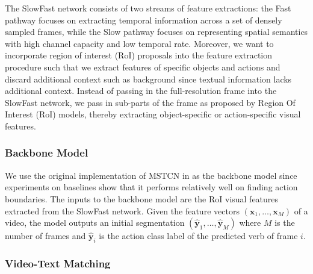 The SlowFast network \cite{feichtenhofer2019slowfast} consists of two streams of feature extractions: the Fast pathway focuses on extracting temporal information across a set of densely sampled frames, while the Slow pathway focuses on representing spatial semantics with high channel capacity and low temporal rate. Moreover, we want to incorporate region of interest (RoI) proposals into the feature extraction procedure such that we extract features of specific objects and actions and discard additional context such as background since textual information lacks additional context. Instead of passing in the full-resolution frame into the SlowFast network, we pass in sub-parts of the frame as proposed by Region Of Interest (RoI) models, thereby extracting object-specific or action-specific visual features. 

\subsubsection{Backbone Model}
We use the original implementation of MSTCN in  as the backbone model since experiments on baselines show that it performs relatively well on finding action boundaries. The inputs to the backbone model are the RoI visual features extracted from the SlowFast network. Given the feature vectors $(\mathbf{x}_1,\dots,\mathbf{x}_M)$ of a video, the model outputs an initial segmentation $(\hat{\mathbf{y}}_1,\dots,\hat{\mathbf{y}}_M)$ where $M$ is the number of frames and $\hat{\mathbf{y}}_i$ is the action class label of the predicted verb of frame $i$.


\subsubsection{Video-Text Matching}

